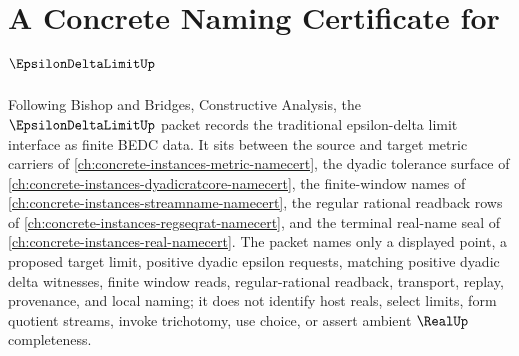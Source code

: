 \chapter{A Concrete Naming Certificate for $\EpsilonDeltaLimitUp$}
\label{ch:concrete-instances-epsilon-delta-limit-namecert}

Following Bishop and Bridges, Constructive Analysis, the $\EpsilonDeltaLimitUp$ packet records the traditional epsilon-delta limit interface as finite BEDC data. It sits between the source and target metric carriers of \autoref{ch:concrete-instances-metric-namecert}, the dyadic tolerance surface of \autoref{ch:concrete-instances-dyadicratcore-namecert}, the finite-window names of \autoref{ch:concrete-instances-streamname-namecert}, the regular rational readback rows of \autoref{ch:concrete-instances-regseqrat-namecert}, and the terminal real-name seal of \autoref{ch:concrete-instances-real-namecert}. The packet names only a displayed point, a proposed target limit, positive dyadic epsilon requests, matching positive dyadic delta witnesses, finite window reads, regular-rational readback, transport, replay, provenance, and local naming; it does not identify host reals, select limits, form quotient streams, invoke trichotomy, use choice, or assert ambient $\RealUp$ completeness.

